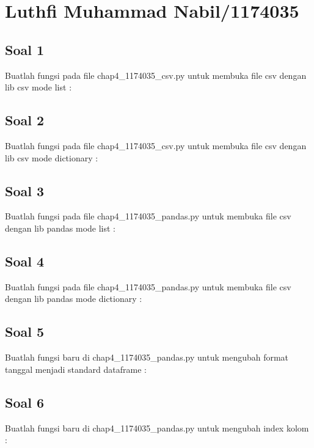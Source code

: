 \section{Luthfi Muhammad Nabil/1174035}
\subsection{Soal 1}
Buatlah fungsi pada file chap4\_1174035\_csv.py untuk membuka file csv dengan lib csv mode list : 


\subsection{Soal 2}
Buatlah fungsi pada file chap4\_1174035\_csv.py untuk membuka file csv dengan lib csv mode dictionary : 


\subsection{Soal 3}
Buatlah fungsi pada file chap4\_1174035\_pandas.py untuk membuka file csv dengan lib pandas mode list : 


\subsection{Soal 4}
Buatlah fungsi pada file chap4\_1174035\_pandas.py untuk membuka file csv dengan lib pandas mode dictionary : 


\subsection{Soal 5}
Buatlah fungsi baru di chap4\_1174035\_pandas.py untuk mengubah format tanggal menjadi standard dataframe : 


\subsection{Soal 6}
Buatlah fungsi baru di chap4\_1174035\_pandas.py untuk mengubah index kolom : 


